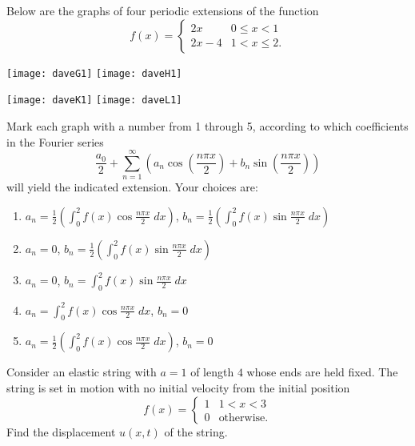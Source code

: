 \documentclass[11pt]{exam}
\begin{document}
\begin{questions}

\newpage

\question[12] Below are the graphs of four periodic extensions of the
function
\[
f(x) = \begin{cases}
 2x & 0 \leq x < 1 \\
 2x-4 & 1 < x \leq 2.
\end{cases}
\]


\texttt{[image: daveG1]}  \texttt{[image: daveH1]} 


\texttt{[image: daveK1]} \texttt{[image: daveL1]}

Mark each graph with a number from 1 through 5, according to which
coefficients in the Fourier series
\[
\frac{a_0}{2} + \sum_{n=1}^{\infty} \left( a_n \cos \left( \frac{n\pi
      x}{2} \right) + b_n \sin \left( \frac{n\pi x}{2} \right) \right)
\]
will yield the indicated extension. Your choices are:

\begin{enumerate}
\item $\displaystyle{ a_n = \frac{1}{2} \left( \int_0^2 f(x) \cos
      \frac{n \pi x}{2} \; dx \right)}$, \quad $\displaystyle{b_n = \frac{1}{2} \left(
      \int_0^2 f(x) \sin \frac{n \pi x}{2} \; dx \right) }$
\item $\displaystyle{ a_n = 0 }$, \quad $\displaystyle{b_n = \frac{1}{2} \left( \int_0^2
      f(x) \sin \frac{n \pi x}{2} \; dx \right) } $
\item $\displaystyle{ a_n = 0}$, \quad $\displaystyle{b_n = \int_0^2 f(x) \sin
      \frac{n \pi x}{2} \; dx }$
\item $\displaystyle{ a_n = \int_0^2 f(x) \cos \frac{n \pi x}{2} \; dx
  }$, \quad $b_n = 0 $ 
\item $\displaystyle{ a_n = \frac{1}{2} \left( \int_0^2 f(x) \cos
      \frac{n \pi x}{2} \; dx \right)}$, \quad $b_n = 0 $
\end{enumerate}

\newpage

\question[12] Consider an elastic string with $a = 1$ of length $4$ whose ends are held
fixed. The string is set in motion with no initial velocity from the
initial position
\[
f(x) = \begin{cases}
1 & 1 < x < 3 \\
0 & \text{otherwise}.
\end{cases}
\]
Find the displacement $u(x,t)$ of the string.

\end{questions}
\end{document}
